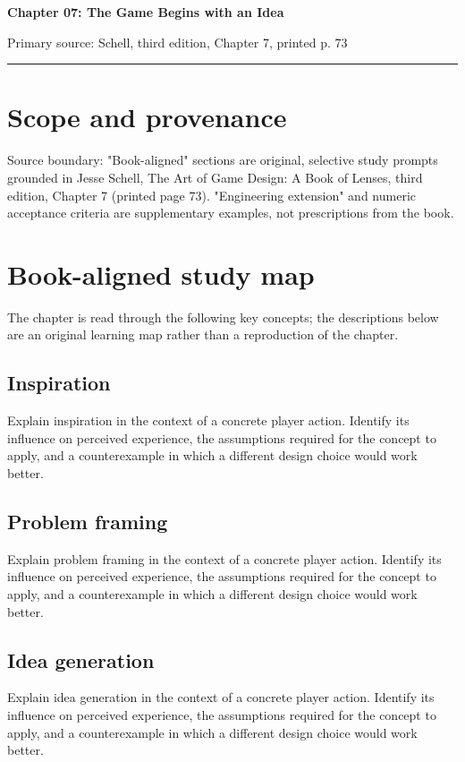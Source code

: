 \documentclass[11pt]{article}
\begin{document}
{\huge\bfseries\color{suiteblue} Chapter 07: The Game Begins with an Idea}\par
\vspace{0.15in}
{\normalsize\color{suitegray} Primary source: Schell, third edition, Chapter 7, printed p. 73}\par
\vspace{0.15in}\hrule\vspace{0.15in}

\section{Scope and provenance}
Source boundary: "Book-aligned" sections are original, selective study prompts grounded in Jesse Schell, The Art of Game Design: A Book of Lenses, third edition, Chapter 7 (printed page 73). "Engineering extension" and numeric acceptance criteria are supplementary examples, not prescriptions from the book.


\section{Book-aligned study map}
The chapter is read through the following key concepts; the descriptions below are an original learning map rather than a reproduction of the chapter.


\subsection{Inspiration}
Explain inspiration in the context of a concrete player action. Identify its influence on perceived experience, the assumptions required for the concept to apply, and a counterexample in which a different design choice would work better.


\subsection{Problem framing}
Explain problem framing in the context of a concrete player action. Identify its influence on perceived experience, the assumptions required for the concept to apply, and a counterexample in which a different design choice would work better.


\subsection{Idea generation}
Explain idea generation in the context of a concrete player action. Identify its influence on perceived experience, the assumptions required for the concept to apply, and a counterexample in which a different design choice would work better.
\end{document}
